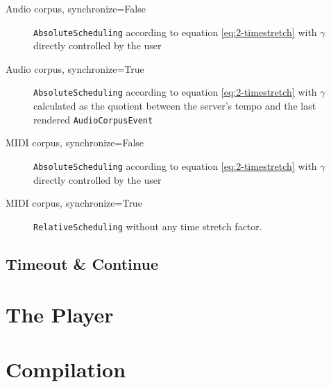 \begin{description}
	\item[Audio corpus, synchronize=False] \texttt{AbsoluteScheduling} according to equation \ref{eq:2-timestretch} with $\gamma$ directly controlled by the user
	\item[Audio corpus, synchronize=True] \texttt{AbsoluteScheduling} according to equation \ref{eq:2-timestretch} with $\gamma$ calculated as the quotient between the server's tempo and the last rendered \texttt{AudioCorpusEvent}
	\item[MIDI corpus, synchronize=False] \texttt{AbsoluteScheduling} according to equation \ref{eq:2-timestretch} with $\gamma$ directly controlled by the user
	\item[MIDI corpus, synchronize=True] \texttt{RelativeScheduling} without any time stretch factor.
\end{description}



\subsection{Timeout \& Continue}\label{ssec:2-timeout}














\section{The Player}\label{ssec:2-player}


\section{Compilation}\label{ssec:2-compilation}

